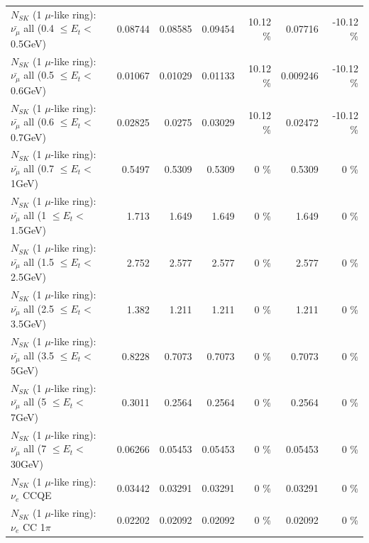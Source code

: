 \begin{table}
\begin{tabular}{| l | r | r | r  r | r  r |}
 $N_{SK}$ (1 $\mu$-like ring): $\bar{\nu_{\mu}}$ all (0.4 $\leq E_{t} <$ 0.5GeV) &         0.08744 &         0.08585 &         0.09454 &    10.12 \%  &         0.07716 &   -10.12 \%  \\ 
 $N_{SK}$ (1 $\mu$-like ring): $\bar{\nu_{\mu}}$ all (0.5 $\leq E_{t} <$ 0.6GeV) &         0.01067 &         0.01029 &         0.01133 &    10.12 \%  &        0.009246 &   -10.12 \%  \\ 
 $N_{SK}$ (1 $\mu$-like ring): $\bar{\nu_{\mu}}$ all (0.6 $\leq E_{t} <$ 0.7GeV) &         0.02825 &          0.0275 &         0.03029 &    10.12 \%  &         0.02472 &   -10.12 \%  \\ 
   $N_{SK}$ (1 $\mu$-like ring): $\bar{\nu_{\mu}}$ all (0.7 $\leq E_{t} <$ 1GeV) &          0.5497 &          0.5309 &          0.5309 &        0 \%  &          0.5309 &        0 \%  \\ 
   $N_{SK}$ (1 $\mu$-like ring): $\bar{\nu_{\mu}}$ all (1 $\leq E_{t} <$ 1.5GeV) &           1.713 &           1.649 &           1.649 &        0 \%  &           1.649 &        0 \%  \\ 
 $N_{SK}$ (1 $\mu$-like ring): $\bar{\nu_{\mu}}$ all (1.5 $\leq E_{t} <$ 2.5GeV) &           2.752 &           2.577 &           2.577 &        0 \%  &           2.577 &        0 \%  \\ 
 $N_{SK}$ (1 $\mu$-like ring): $\bar{\nu_{\mu}}$ all (2.5 $\leq E_{t} <$ 3.5GeV) &           1.382 &           1.211 &           1.211 &        0 \%  &           1.211 &        0 \%  \\ 
   $N_{SK}$ (1 $\mu$-like ring): $\bar{\nu_{\mu}}$ all (3.5 $\leq E_{t} <$ 5GeV) &          0.8228 &          0.7073 &          0.7073 &        0 \%  &          0.7073 &        0 \%  \\ 
     $N_{SK}$ (1 $\mu$-like ring): $\bar{\nu_{\mu}}$ all (5 $\leq E_{t} <$ 7GeV) &          0.3011 &          0.2564 &          0.2564 &        0 \%  &          0.2564 &        0 \%  \\ 
    $N_{SK}$ (1 $\mu$-like ring): $\bar{\nu_{\mu}}$ all (7 $\leq E_{t} <$ 30GeV) &         0.06266 &         0.05453 &         0.05453 &        0 \%  &         0.05453 &        0 \%  \\ 
\hline
\hline
\hline
                                      $N_{SK}$ (1 $\mu$-like ring): $\nu_e$ CCQE &         0.03442 &         0.03291 &         0.03291 &        0 \%  &         0.03291 &        0 \%  \\ 
                                 $N_{SK}$ (1 $\mu$-like ring): $\nu_e$ CC 1$\pi$ &         0.02202 &         0.02092 &         0.02092 &        0 \%  &         0.02092 &        0 \%  \\ 

\end{tabular}
\end{table}
